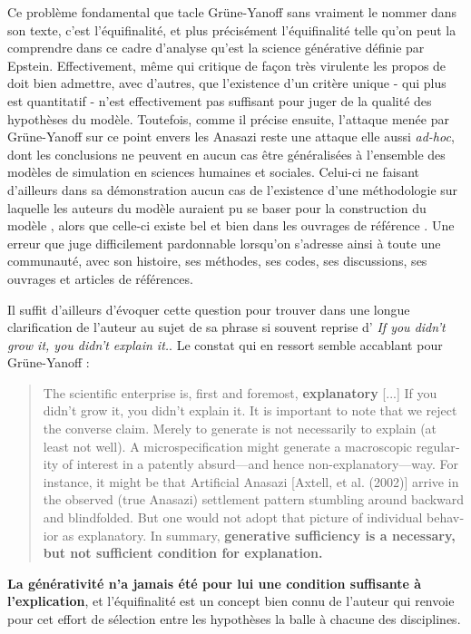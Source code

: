 Ce problème fondamental que tacle Grüne-Yanoff sans vraiment le nommer dans son texte, c'est l'équifinalité, et plus précisément l'équifinalité telle qu'on peut la comprendre dans ce cadre d'analyse qu'est la science générative définie par Epstein. Effectivement, même \textcite{Chattoe2011} qui critique de façon très virulente les propos de \textcite{Yanoff2008} doit bien admettre, avec d'autres, que l'existence d'un critère unique - qui plus est quantitatif - n'est effectivement pas suffisant pour juger de la qualité des hypothèses du modèle. Toutefois, comme il précise ensuite, l'attaque menée par Grüne-Yanoff sur ce point envers les Anasazi reste une attaque elle aussi \textit{ad-hoc}, dont les conclusions ne peuvent en aucun cas être généralisées à l'ensemble des modèles de simulation en sciences humaines et sociales. Celui-ci ne faisant d'ailleurs dans sa démonstration aucun cas de l'existence d'une méthodologie sur laquelle les auteurs du modèle auraient pu se baser pour la construction du modèle , alors que celle-ci existe bel et bien dans les ouvrages de référence \autocites{Gilbert1995a, Gilbert2005}. Une erreur que \textcite{Chattoe2011} juge difficilement pardonnable lorsqu'on s'adresse ainsi à toute une communauté, avec son histoire, ses méthodes, ses codes, ses discussions, ses ouvrages et articles de références.

Il suffit d'ailleurs d'évoquer cette question pour trouver dans \textcite{Epstein2006} une longue clarification de l'auteur au sujet de sa phrase si souvent reprise d'\textcite{Epstein1999} \textit{If you didn’t grow it, you didn’t explain it.}. Le constat qui en ressort semble accablant pour Grüne-Yanoff :

\foreignblockquote{english}[\cite{Epstein2006}]{The scientific enterprise is, first and foremost, \textbf{explanatory} [...] If you didn’t grow it, you didn’t explain it. It is important to note that we reject the converse claim. Merely to generate is not necessarily to explain (at least not well). A microspecification might generate a macroscopic regularity of interest in a patently absurd—and hence non-explanatory—way. For instance, it might be that Artificial Anasazi [Axtell, et al. (2002)] arrive in the observed (true Anasazi) settlement pattern stumbling around backward and blindfolded. But one would not adopt that picture of individual behavior as explanatory. In summary, \textbf{generative sufficiency is a necessary, but not sufficient condition for explanation.}}

\textbf{La générativité n'a jamais été pour lui une condition suffisante à l'explication}, et l'équifinalité est un concept bien connu de l'auteur qui renvoie pour cet effort de sélection entre les hypothèses la balle à chacune des disciplines.


